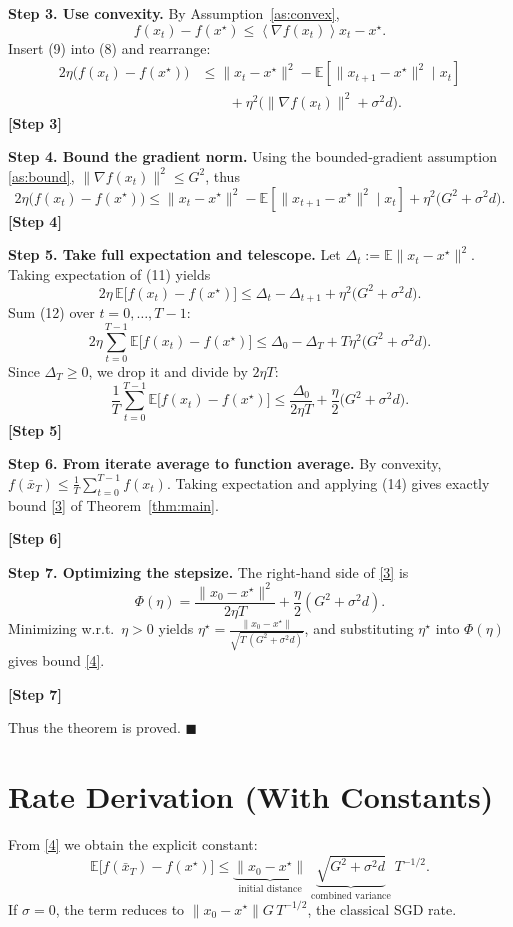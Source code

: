 \documentclass{article}
\newcommand{\EE}{\mathbb{E}}
\newcommand{\norm}[1]{\left\|#1\right\|}
\newcommand{\inner}[1]{\left\langle #1 \right\rangle}
\begin{document}
\bigskip
\noindent\textbf{Step 3. Use convexity.}  
By Assumption~\ref{as:convex},
\[
f(x_t)-f(x^\star) \le \inner{\nabla f(x_t)}{x_t-x^\star}.
\tag{9}
\]
Insert (9) into (8) and rearrange:
\[
\begin{aligned}
2\eta\bigl(f(x_t)-f(x^\star)\bigr)
&\le \|x_t-x^\star\|^2 - \EE\!\left[\|x_{t+1}-x^\star\|^2\mid x_t\right] \\
&\qquad +\eta^2\bigl(\|\nabla f(x_t)\|^2+\sigma^2 d\bigr) .
\end{aligned}
\tag{10}
\]
\noindent\textbf{[Step 3]}

\bigskip
\noindent\textbf{Step 4. Bound the gradient norm.}  
Using the bounded‑gradient assumption \ref{as:bound},
$\|\nabla f(x_t)\|^2\le G^2$, thus
\[
2\eta\bigl(f(x_t)-f(x^\star)\bigr)
\le \|x_t-x^\star\|^2 - \EE\!\left[\|x_{t+1}-x^\star\|^2\mid x_t\right]
   +\eta^2\bigl(G^2+\sigma^2 d\bigr).
\tag{11}
\]
\noindent\textbf{[Step 4]}

\bigskip
\noindent\textbf{Step 5. Take full expectation and telescope.}  
Let $\Delta_t:=\EE\|x_t-x^\star\|^2$. Taking expectation of (11) yields
\[
2\eta\,\EE\!\bigl[f(x_t)-f(x^\star)\bigr]
\le \Delta_t - \Delta_{t+1}
   +\eta^2\bigl(G^2+\sigma^2 d\bigr).
\tag{12}
\]
Sum (12) over $t=0,\dots,T-1$:
\[
2\eta\sum_{t=0}^{T-1}\EE\!\bigl[f(x_t)-f(x^\star)\bigr]
\le \Delta_0 - \Delta_T + T\eta^2\bigl(G^2+\sigma^2 d\bigr).
\tag{13}
\]
Since $\Delta_T\ge0$, we drop it and divide by $2\eta T$:
\[
\frac{1}{T}\sum_{t=0}^{T-1}\EE\!\bigl[f(x_t)-f(x^\star)\bigr]
\le
\frac{\Delta_0}{2\eta T}
     +\frac{\eta}{2}\bigl(G^2+\sigma^2 d\bigr).
\tag{14}
\]
\noindent\textbf{[Step 5]}

\bigskip
\noindent\textbf{Step 6. From iterate average to function average.}  
By convexity,
$f(\bar x_T)\le\frac1T\sum_{t=0}^{T-1}f(x_t)$. Taking expectation and applying (14) gives exactly bound \eqref{3} of Theorem~\ref{thm:main}.

\noindent\textbf{[Step 6]}

\bigskip
\noindent\textbf{Step 7. Optimizing the stepsize.}  
The right‑hand side of \eqref{3} is
\[
\Phi(\eta)=\frac{\|x_0-x^\star\|^2}{2\eta T}+\frac{\eta}{2}(G^2+\sigma^2 d).
\]
Minimizing w.r.t.\ $\eta>0$ yields $\eta^\star
= \frac{\|x_0-x^\star\|}{\sqrt{T\,(G^2+\sigma^2 d)}}$, and substituting $\eta^\star$ into $\Phi(\eta)$ gives bound \eqref{4}.

\noindent\textbf{[Step 7]}

Thus the theorem is proved. \hfill $\blacksquare$

\section*{Rate Derivation (With Constants)}
From \eqref{4} we obtain the explicit constant:
\[
\EE\!\bigl[f(\bar x_T)-f(x^\star)\bigr]
\le
\underbrace{\norm{x_0-x^\star}}_{\text{initial distance}}
\;\underbrace{\sqrt{G^2+\sigma^2 d}}_{\text{combined variance}}
\;T^{-1/2}.
\]
If $\sigma=0$, the term reduces to $\norm{x_0-x^\star}G\,T^{-1/2}$, the classical SGD rate.
\end{document}
